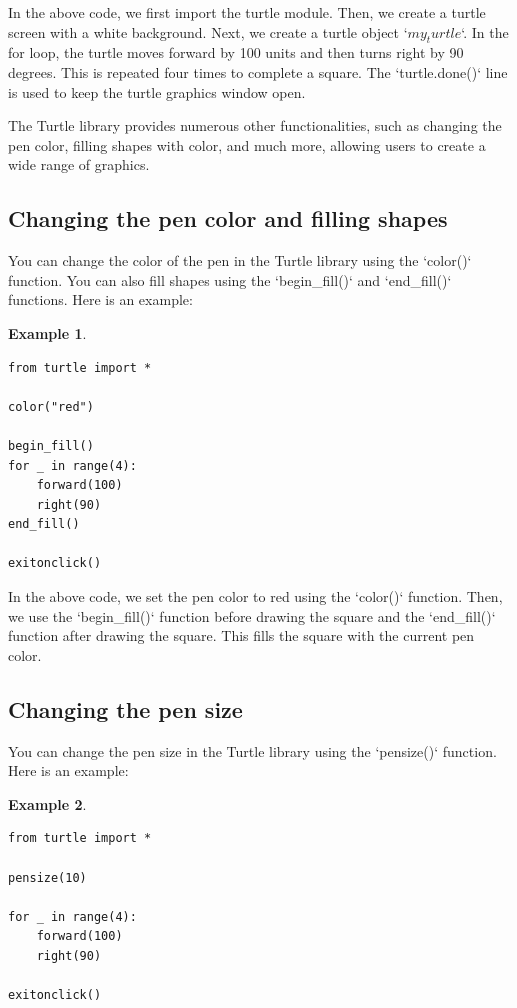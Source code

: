 \documentclass[12pt]{article}
\newtheorem{Example}{Example}[section]
\begin{document}
In the above code, we first import the turtle module. Then, we create a turtle screen with a white background. Next, we create a turtle object `$my_turtle$`. In the for loop, the turtle moves forward by 100 units and then turns right by 90 degrees. This is repeated four times to complete a square. The `turtle.done()` line is used to keep the turtle graphics window open.

The Turtle library provides numerous other functionalities, such as changing the pen color, filling shapes with color, and much more, allowing users to create a wide range of graphics.
\subsection{Changing the pen color and filling shapes}

You can change the color of the pen in the Turtle library using the `color()` function. You can also fill shapes using the `begin_fill()` and `end_fill()` functions. Here is an example:

\begin{Example}
\begin{lstlisting}
from turtle import *

color("red")

begin_fill()
for _ in range(4):
    forward(100)
    right(90)
end_fill()

exitonclick()
\end{lstlisting}
\end{Example}

In the above code, we set the pen color to red using the `color()` function. Then, we use the `begin_fill()` function before drawing the square and the `end_fill()` function after drawing the square. This fills the square with the current pen color. 

\subsection{Changing the pen size}

You can change the pen size in the Turtle library using the `pensize()` function. Here is an example:

\begin{Example}
\begin{lstlisting}
from turtle import *

pensize(10)

for _ in range(4):
    forward(100)
    right(90)

exitonclick()
\end{lstlisting}
\end{Example}
\end{document}

